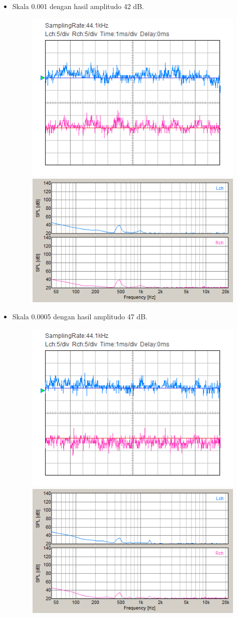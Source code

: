 \documentclass[12pt,]{article}
\begin{document}
\begin{itemize}
		\item Skala 0.001 dengan hasil amplitudo 42 dB.
		\begin{figure}[H]
			\centering
			\includegraphics[width=0.45\linewidth]{result/day_4/500Hz/tone0001}
			\includegraphics[width=0.45\linewidth]{result/day_4/500Hz/fft_tone0001}
		\end{figure}

		\item Skala 0.0005 dengan hasil amplitudo 47 dB.
		\begin{figure}[H]
			\centering
			\includegraphics[width=0.45\linewidth]{result/day_4/500Hz/tone00005}
			\includegraphics[width=0.45\linewidth]{result/day_4/500Hz/fft_tone00005}
		\end{figure}


\end{itemize}
\end{document}
